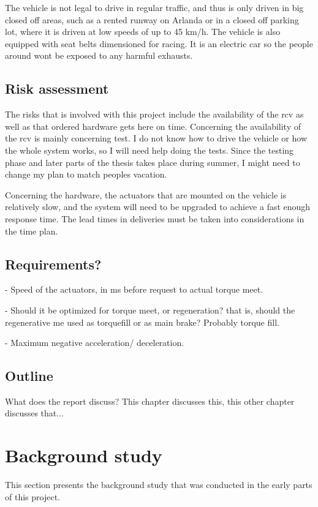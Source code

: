 \documentclass[a4paper,11pt]{kth-mag}
\begin{document}
The vehicle is not legal to drive in regular traffic, and thus is only driven in big closed off areas, such as a rented runway on Arlanda or in a closed off parking lot, where it is driven at low speeds of up to 45 km/h. The vehicle is also equipped with seat belts dimensioned for racing. 
It is an electric car so the people around wont be exposed to any harmful exhausts. 


\section{Risk assessment}
The risks that is involved with this project include the availability of the \gls{rcv} as well as that ordered hardware gets here on time. Concerning the availability of the \gls{rcv} is mainly concerning test. I do not know how to drive the vehicle or how the whole system works, so I will need help doing the tests. Since the testing phase and later parts of the thesis takes place during summer, I might need to change my plan to match peoples vacation. \newline

Concerning the hardware, the actuators that are mounted on the vehicle is relatively slow, and the system will need to be upgraded to achieve a fast enough response time. The lead times in deliveries must be taken into considerations in the time plan.

\section{Requirements?}

- Speed of the actuators, in ms before request to actual torque meet.

- Should it be optimized for torque meet, or regeneration? that is, should the regenerative me used as torquefill or as main brake? Probably torque fill.

- Maximum negative acceleration/ deceleration.

\section{Outline}
What does the report discuss?
This chapter discusses this, this other chapter discusses that...



\chapter{Background study}
This section presents the background study that was conducted in the early parts of this project. 
\end{document}
